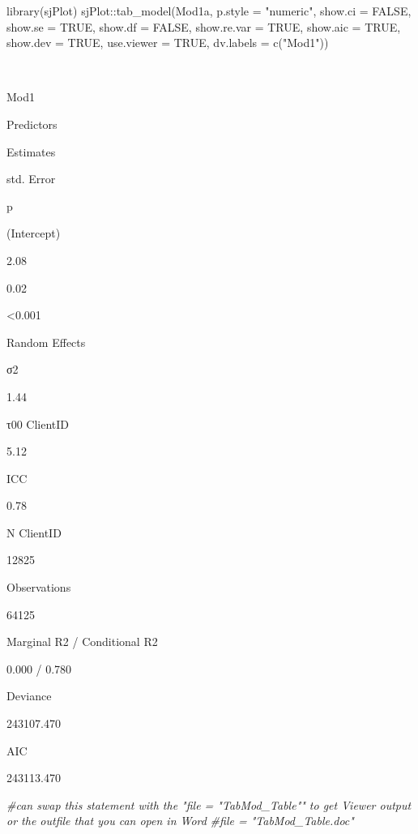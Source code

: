 \documentclass[
  11pt,
]{book}
\newenvironment{Shaded}{\begin{snugshade}}{\end{snugshade}}
\newcommand{\AttributeTok}[1]{\textcolor[rgb]{0.77,0.63,0.00}{#1}}
\newcommand{\CommentTok}[1]{\textcolor[rgb]{0.56,0.35,0.01}{\textit{#1}}}
\newcommand{\ConstantTok}[1]{\textcolor[rgb]{0.00,0.00,0.00}{#1}}
\newcommand{\FunctionTok}[1]{\textcolor[rgb]{0.00,0.00,0.00}{#1}}
\newcommand{\NormalTok}[1]{#1}
\newcommand{\SpecialCharTok}[1]{\textcolor[rgb]{0.00,0.00,0.00}{#1}}
\newcommand{\StringTok}[1]{\textcolor[rgb]{0.31,0.60,0.02}{#1}}
\begin{document}
\begin{Shaded}
\begin{Highlighting}[]
\FunctionTok{library}\NormalTok{(sjPlot)}
\NormalTok{sjPlot}\SpecialCharTok{::}\FunctionTok{tab\_model}\NormalTok{(Mod1a, }\AttributeTok{p.style =} \StringTok{"numeric"}\NormalTok{, }\AttributeTok{show.ci =} \ConstantTok{FALSE}\NormalTok{, }\AttributeTok{show.se =} \ConstantTok{TRUE}\NormalTok{, }\AttributeTok{show.df =} \ConstantTok{FALSE}\NormalTok{, }\AttributeTok{show.re.var =} \ConstantTok{TRUE}\NormalTok{, }\AttributeTok{show.aic =} \ConstantTok{TRUE}\NormalTok{, }\AttributeTok{show.dev =} \ConstantTok{TRUE}\NormalTok{, }\AttributeTok{use.viewer =} \ConstantTok{TRUE}\NormalTok{, }\AttributeTok{dv.labels =} \FunctionTok{c}\NormalTok{(}\StringTok{"Mod1"}\NormalTok{))}
\end{Highlighting}
\end{Shaded}

~

Mod1

Predictors

Estimates

std. Error

p

(Intercept)

2.08

0.02

\textless0.001

Random Effects

σ2

1.44

τ00 ClientID

5.12

ICC

0.78

N ClientID

12825

Observations

64125

Marginal R2 / Conditional R2

0.000 / 0.780

Deviance

243107.470

AIC

243113.470

\begin{Shaded}
\begin{Highlighting}[]
\CommentTok{\#can swap this statement with the "file = "TabMod\_Table"" to get Viewer output or the outfile that you can open in Word}
\CommentTok{\#file = "TabMod\_Table.doc"}
\end{Highlighting}
\end{Shaded}
\end{document}
